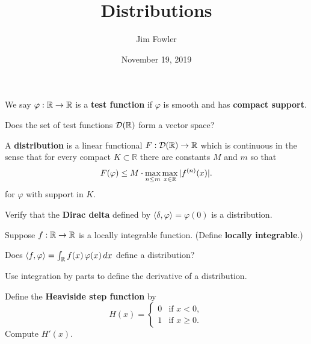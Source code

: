 \documentclass{homework}
\author{Jim Fowler}
\title{Distributions}
\date{November 19, 2019}
\newcommand{\D}{\mathcal{D}}
\begin{document}
\maketitle

\begin{problem}
  We say $\varphi : \mathbb{R} \to \mathbb{R}$ is a  \textbf{test function} if $\varphi$ is smooth and has \textbf{compact support}.

  Does the set of test functions $\D(\R)$ form a vector space?
\end{problem}

\vfill

\begin{problem}
  A \textbf{distribution} is a linear functional $F : \D(\R) \to \R$ which
  is continuous in the sense that
  for every
  compact $K \subset \mathbb{R}$ there are constants $M$ and $m$ so
  that
  \[
    F(\varphi) \leq M \cdot \max_{n \leq m} \max_{x \in \mathbb{R}} | f^{(n)}(x) |.
  \]
  for $\varphi$ with support in $K$.


  Verify that the \textbf{Dirac delta} defined by
  $\langle \delta, \varphi \rangle = \varphi(0)$ is a distribution.
\end{problem}

\vfill

\begin{problem}
  Suppose $f : \mathbb{R} \to \mathbb{R}$ is a locally integrable function.  (Define
  \textbf{locally integrable}.)

  Does $\langle f, \varphi \rangle = \int_{\mathbb{R}} f(x) \, \varphi(x) \, dx$
  define a distribution?  %
\end{problem}

\vfill

\begin{problem}
  Use integration by parts to define the derivative of a distribution.
\end{problem}

\vfill

\begin{problem}
  Define the \textbf{Heaviside step function} by
  \[
    H(x) = \begin{cases}
      0 &\mbox{if $x < 0$}, \\
      1 &\mbox{if $x \geq 0$}.
    \end{cases}
  \]
  Compute $H'(x)$.
\end{problem}
\end{document}
